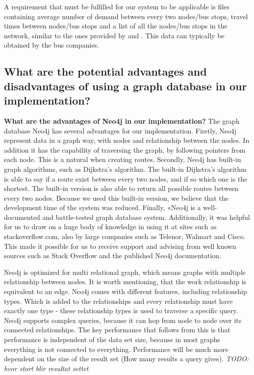 A requirement that must be fulfilled for our system to be applicable is files containing average number of demand between every two nodes/bus stops, travel times between nodes/bus stops and a list of all the nodes/bus stops in the network, similar to the ones provided by \citet{mandl79} and \citet{mumford13}. This data can typically be obtained by the bus companies.

\subsection{What are the potential advantages and disadvantages of using a graph database in our implementation?}

\textbf{What are the advantages of Neo4j in our implementation?}
The graph database Neo4j has several advantages for our implementation. Firstly, Neo4j represent data in a graph way, with nodes and relationship between the nodes. In addition it has the capability of traversing the graph, by following pointers from each node. This is a natural when creating routes. Secondly, Neo4j has built-in graph algorithms, such as Dijkstra's algorithm. The built-in Dijkstra's algorithm is able to say if a route exist between every two nodes, and if so which one is the shortest. The built-in version is also able to return all possible routes between every two nodes. Because we used this built-in version, we believe that the development time of the system was reduced. Finally, «Neo4j is a well-documented and battle-tested graph database system. Additionally, it was helpful for us to draw on a huge body of knowledge in using it at sites such as stackoverflow.com, also by large companies such as Telenor, Walmart and Cisco. This made it possible for us to receive support and advising from well known sources such as Stack Overflow and the published Neo4j documentation. 


Neo4j is optimized for multi relational graph, which means graphs with multiple relationship between nodes. It is worth mentioning, that the work relationship is equivalent to an edge. Neo4j comes with different features, including relationship types. Which is added to the relationships and every relationship must have exactly one type - these relationship types is used to traverse a specific query. Neo4j supports complex queries, because it can hop from node to node over its connected relationships. The key performance that follows from this is that performance is independent of the data set size, because in most graphs everything is not connected to everything. Performance will be much more dependent on the size of the result set (How many results a query gives).  \emph{\color{blue} TODO: hvor stort blir resultat settet }

